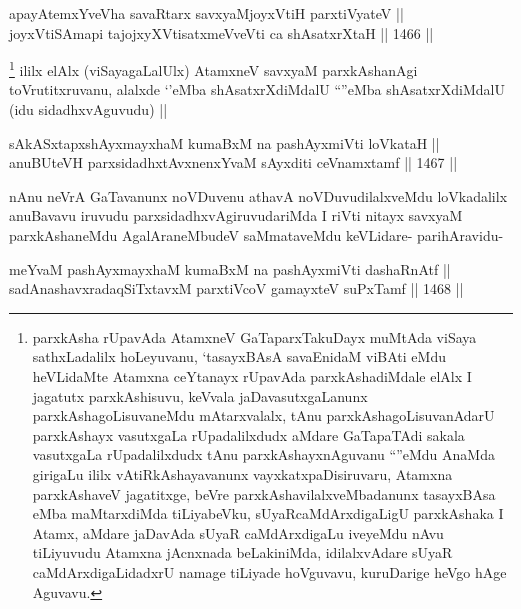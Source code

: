 
\begin{shl}
apayAtemxYveVha savaRtarx savxyaMjoyxVtiH parxtiVyateV || \\
joyxVtiSAmapi tajojxyXVtisatxmeVveVti ca shAsatxrXtaH ||  1466 ||  
\end{shl}

\begin{artha}
\footnote{parxkAsha rUpavAda AtamxneV GaTaparxTakuDayx muMtAda viSaya sathxLadalilx hoLeyuvanu, `tasayxBAsA savaEnidaM viBAti eMdu heVLidaMte Atamxna ceYtanayx rUpavAda parxkAshadiMdale elAlx I jagatutx parxkAshisuvu, keVvala jaDavasutxgaLanunx parxkAshagoLisuvaneMdu mAtarxvalalx, tAnu parxkAshagoLisuvanAdarU parxkAshayx vasutxgaLa rUpadalilxdudx aMdare GaTapaTAdi sakala vasutxgaLa rUpadalilxdudx tAnu parxkAshayxnAguvanu ``\stext''eMdu AnaMda girigaLu ililx vAtiRkAshayavanunx vayxkatxpaDisiruvaru, Atamxna parxkAshaveV jagatitxge, beVre parxkAshavilalxveMbadanunx tasayxBAsa eMba maMtarxdiMda tiLiyabeVku, sUyaRcaMdArxdigaLigU parxkAshaka I Atamx, aMdare jaDavAda sUyaR caMdArxdigaLu iveyeMdu nAvu tiLiyuvudu Atamxna jAcnxnada beLakiniMda, idilalxvAdare sUyaR caMdArxdigaLidadxrU namage tiLiyade hoVguvavu, kuruDarige heVgo hAge Aguvavu.}
ililx elAlx (viSayagaLalUlx) AtamxneV savxyaM parxkAshanAgi toVrutitxruvanu, alalxde `\stext'eMba shAsatxrXdiMdalU ``\stext''eMba shAsatxrXdiMdalU (idu sidadhxvAguvudu) ||
\end{artha}


\begin{shl}
sAkASxtapxshAyxmayxhaM kumaBxM na pashAyxmiVti loVkataH || \\
anuBUteVH parxsidadhxtAvxnenxYvaM sAyxditi ceVnamxtamf ||  1467 ||  
\end{shl}

\begin{artha}
nAnu neVrA GaTavanunx noVDuvenu athavA noVDuvudilalxveMdu loVkadalilx anuBavavu iruvudu parxsidadhxvAgiruvudariMda I riVti nitayx savxyaM parxkAshaneMdu AgalAraneMbudeV saMmataveMdu keVLidare- parihAravidu-
\end{artha}

\begin{shl}
meYvaM pashAyxmayxhaM kumaBxM na pashAyxmiVti dashaRnAtf || \\
sadA\s nashavxradaqSiTxtavxM parxtiVcoV gamayxteV suPxTamf ||  1468 ||  
\end{shl}

